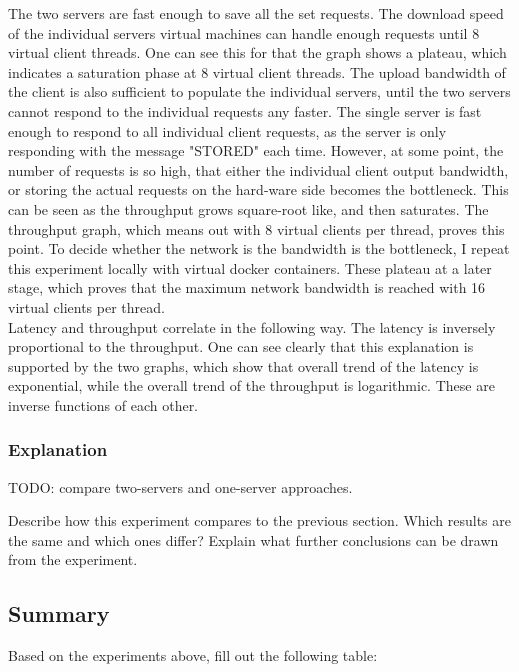 \documentclass[11pt,a4paper]{article}
\begin{document}
The two servers are fast enough to save all the set requests.
The download speed of the individual servers virtual machines can handle enough requests until 8 virtual client threads.
One can see this for that the graph shows a plateau, which indicates a saturation phase at 8 virtual client threads.
The upload bandwidth of the client is also sufficient to populate the individual servers, until the two servers cannot respond to the individual requests any faster.
The single server is fast enough to respond to all individual client requests, as the server is only responding with the message "STORED" each time.
However, at some point, the number of requests is so high, that either the individual client output bandwidth, or storing the actual requests on the hard-ware side becomes the bottleneck.
This can be seen as the throughput grows square-root like, and then saturates.
The throughput graph, which means out with 8 virtual clients per thread, proves this point.
To decide whether the network is the bandwidth is the bottleneck, I repeat this experiment locally with virtual docker containers.
These plateau at a later stage, which proves that the maximum network bandwidth is reached with 16 virtual clients per thread. \\

Latency and throughput correlate in the following way. 
The latency is inversely proportional to the throughput.
One can see clearly that this explanation is supported by the two graphs, which show that overall trend of the latency is exponential, while the overall trend of the throughput is logarithmic.
These are inverse functions of each other.

\subsubsection{Explanation}

TODO: compare two-servers and one-server approaches.

Describe how this experiment compares to the previous section. Which results are the same and which ones differ? Explain what further conclusions can be drawn from the experiment.


\subsection{Summary}

Based on the experiments above, fill out the following table:

\end{document}
